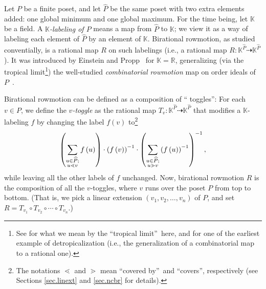 \documentclass[numbers=enddot,12pt,final,onecolumn,notitlepage]{scrartcl}%
\theoremstyle{definition}
\let\sumnonlimits\sum
\renewcommand{\sum}{\sumnonlimits\limits}
\begin{document}
Let $P$ be a finite poset, and let $\widehat{P}$ be the same poset with two
extra elements added: one global minimum and one global maximum. For the time
being, let $\mathbb{K}$ be a field. A \emph{$\mathbb{K}$-labeling of $P$}
means a map from $\widehat{P}$ to $\mathbb{K}$; we view it as a way of
labeling each element of $\widehat{P}$ by an element of $\mathbb{K}$.
Birational rowmotion, as studied conventially, is a rational map $R$ on such
labelings (i.e., a rational map $R:\mathbb{K}^{\widehat{P}}\dashrightarrow
\mathbb{K}^{\widehat{P}}$). It was introduced by Einstein and
Propp~\cite{einstein-propp} for $\mathbb{K}=\mathbb{R}$, generalizing (via the
tropical limit\footnote{See \cite[Section 4.1]{kirillov-intro} for what we
mean by the \textquotedblleft tropical limit\textquotedblright\ here, and
\cite{kirillov-berenstein} for one of the earliest example of
detropicalization (i.e., the generalization of a combinatorial map to a
rational one).}) the well-studied \emph{combinatorial rowmotion} map on order
ideals of $P$~\cite{brouwer-schrijver,striker-williams,propp-roby,row-slow}.

Birational rowmotion can be defined as a composition of \textquotedblleft
toggles\textquotedblright: For each $v\in P$, we define the $v$\emph{-toggle}
as the rational map $T_{v}:\mathbb{K}^{\widehat{P}}\dashrightarrow
\mathbb{K}^{\widehat{P}}$ that modifies a $\mathbb{K}$-labeling $f$ by
changing the label $f\left(  v\right)  $ to\footnote{The notations $\lessdot$
and $\gtrdot$ mean \textquotedblleft covered by\textquotedblright\ and
\textquotedblleft covers\textquotedblright, respectively (see Sections
\ref{sec.linext} and \ref{sec.ncbr} for details).}%
\[
\left(  \sum\limits_{\substack{u\in\widehat{P};\\u\lessdot v}}f\left(
u\right)  \right)  \cdot\left(  f\left(  v\right)  \right)  ^{-1}\cdot\left(
\sum\limits_{\substack{u\in\widehat{P};\\u\gtrdot v}}\left(  f\left(
u\right)  \right)  ^{-1}\right)  ^{-1},
\]
while leaving all the other labels of $f$ unchanged. Now, birational rowmotion
$R$ is the composition of all the $v$-toggles, where $v$ runs over the poset
$P$ from top to bottom. (That is, we pick a linear extension $\left(
v_{1},v_{2},\ldots,v_{n}\right)  $ of $P$, and set $R=T_{v_{1}}\circ T_{v_{2}%
}\circ\cdots\circ T_{v_{n}}$.)
\end{document}
